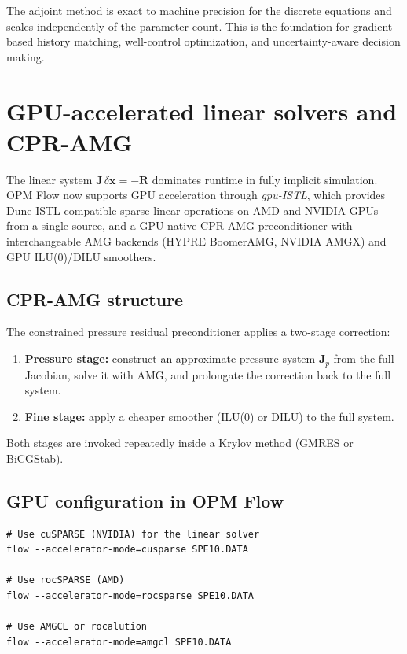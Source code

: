\documentclass[10pt,a4paper]{article}
\begin{document}
The adjoint method is exact to machine precision for the discrete equations
and scales independently of the parameter count. This is the foundation for
gradient-based history matching, well-control optimization, and
uncertainty-aware decision making.

\section{GPU-accelerated linear solvers and CPR-AMG}

The linear system $\bm{J}\,\delta\bm{x}=-\bm{R}$ dominates runtime in fully
implicit simulation. OPM Flow now supports GPU acceleration through
\emph{gpu-ISTL}, which provides Dune-ISTL-compatible sparse linear operations
on AMD and NVIDIA GPUs from a single source, and a GPU-native CPR-AMG
preconditioner with interchangeable AMG backends (HYPRE BoomerAMG, NVIDIA AMGX)
and GPU ILU(0)/DILU smoothers.

\subsection{CPR-AMG structure}

The constrained pressure residual preconditioner applies a two-stage
correction:
\begin{enumerate}[leftmargin=1.4em]
  \item \textbf{Pressure stage:} construct an approximate pressure system
        $\bm{J}_p$ from the full Jacobian, solve it with AMG, and prolongate the
        correction back to the full system.
  \item \textbf{Fine stage:} apply a cheaper smoother (ILU(0) or DILU) to the
        full system.
\end{enumerate}
Both stages are invoked repeatedly inside a Krylov method (GMRES or BiCGStab).

\subsection{GPU configuration in OPM Flow}

\begin{lstlisting}[style=sh, caption={Selecting a GPU linear-solver backend in OPM Flow.}]
# Use cuSPARSE (NVIDIA) for the linear solver
flow --accelerator-mode=cusparse SPE10.DATA

# Use rocSPARSE (AMD)
flow --accelerator-mode=rocsparse SPE10.DATA

# Use AMGCL or rocalution
flow --accelerator-mode=amgcl SPE10.DATA
\end{lstlisting}
\end{document}
